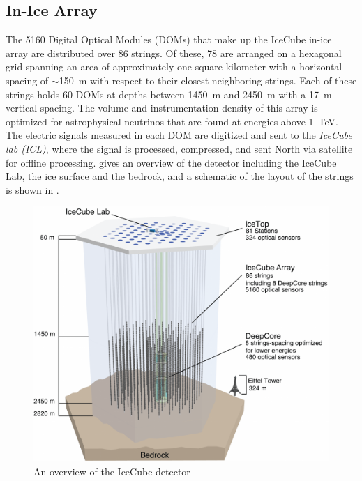 \subsection{In-Ice Array}
The 5160 Digital Optical Modules (DOMs) that make up the IceCube in-ice array are distributed over 86 strings.
Of these, 78 are arranged on a hexagonal grid spanning an area of approximately one square-kilometer with a horizontal spacing of $\sim$150~m with respect to their closest neighboring strings. Each of these strings holds 60 DOMs at depths between 1450~m and 2450~m with a 17~m vertical spacing.
The volume and instrumentation density of this array is optimized for astrophysical neutrinos that are found at energies above 1~TeV\cite{icecube_detector_17}.
The electric signals measured in each DOM are digitized  and sent to the \emph{IceCube lab (ICL)}, where the signal is processed, compressed, and sent North via satellite for offline processing.
 gives an overview of the detector including the IceCube Lab, the ice surface and the bedrock, and a schematic of the layout of the strings is shown in .

\begin{figure}
	\centering \includegraphics{figures/icecube/IceCubeArray_slim.png}
	\caption{An overview of the IceCube detector}
	\label{fig:ic_detector}
\end{figure}

